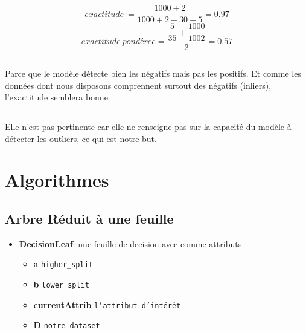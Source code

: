 \documentclass[a4paper]{article}
\begin{document}
\subsection{}
\[ exactitude\
  = \dfrac{1000+2}{1000+2+30+5} = 0.97
\]
\[ exactitude \ pondéree
  = \dfrac{ \dfrac{5}{35} + \dfrac{1000}{1002}}{2} = 0.57
\]


\subsection{}
Parce que le modèle détecte bien les négatifs mais
pas les positifs. Et comme les données dont nous disposons comprennent
surtout des négatifs (inliers), l'exactitude semblera bonne.\\

\subsection{}

Elle n'est pas pertinente car elle ne renseigne pas
sur la capacité du modèle à détecter les outliers, ce qui est notre but.\\



\section{Algorithmes}\label{structures}

\subsection{Arbre Réduit à une feuille\\}




\begin{itemize}
\itemsep1pt\parskip0pt
\item
  \textbf{DecisionLeaf}: une feuille de decision avec comme attributs

  \begin{itemize}
  \itemsep1pt\parskip0pt
  \item
    \textbf{a} \texttt{higher\_split}
  \item
    \textbf{b} \texttt{lower\_split}
  \item
    \textbf{currentAttrib} \texttt{l'attribut d'intérêt}
  \item
    \textbf{D} \texttt{notre dataset\\}
  \end{itemize}
\end{itemize}
\end{document}
